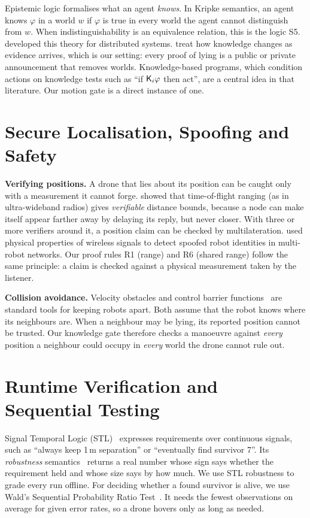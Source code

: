 Epistemic logic formalises what an agent \emph{knows}. In Kripke semantics, an agent knows $\varphi$
in a world $w$ if $\varphi$ is true in every world the agent cannot distinguish from $w$. When indistinguishability is an
equivalence relation, this is the logic S5. \citet{Fagin1995} developed this theory for distributed systems.
\citet{vanDitmarsch2007} treat how knowledge changes as evidence arrives, which is our setting: every proof of lying is
a public or private announcement that removes worlds. Knowledge-based programs, which condition actions on knowledge
tests such as ``if $\mathsf{K}_i\varphi$ then act'', are a central idea in that literature. Our motion gate is a direct
instance of one.

\section{Secure Localisation, Spoofing and Safety}

\textbf{Verifying positions.} A drone that lies about its position can be caught only with a measurement it cannot
forge. \citet{Capkun2005} showed that time-of-flight ranging (as in ultra-wideband radios) gives \emph{verifiable}
distance bounds, because a node can make itself appear farther away by delaying its reply, but never closer. With
three or more verifiers around it, a position claim can be checked by multilateration. \citet{Gil2017} used physical
properties of wireless signals to detect spoofed robot identities in multi-robot networks. Our proof rules R1 (range)
and R6 (shared range) follow the same principle: a claim is checked against a physical measurement taken by the
listener.

\textbf{Collision avoidance.} Velocity obstacles and control barrier functions~\citep{Ames2019} are standard tools
for keeping robots apart. Both assume that the robot knows where its neighbours are. When a
neighbour may be lying, its reported position cannot be trusted. Our knowledge gate therefore checks a manoeuvre
against \emph{every} position a neighbour could occupy in \emph{every} world the drone cannot rule out.

\section{Runtime Verification and Sequential Testing}

Signal Temporal Logic (STL)~\citep{Maler2004} expresses requirements over continuous signals, such as ``always keep
1\,m separation'' or ``eventually find survivor 7''. Its \emph{robustness} semantics~\citep{Donze2010} returns a real
number whose sign says whether the requirement held and whose size says by how much. We use STL robustness to grade
every run offline. For deciding whether a found survivor is alive, we use Wald's Sequential Probability Ratio
Test~\citep{Wald1945}. It needs the fewest observations on average for given error rates, so a drone hovers only as
long as needed.

